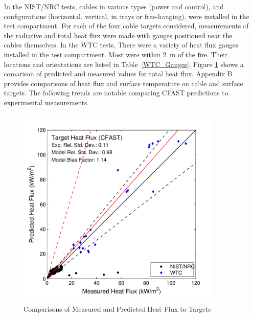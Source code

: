 In the NIST/NRC tests, cables in various types (power and control), and configurations (horizontal, vertical, in trays or free-hanging), were installed in the test compartment. For each of the four cable targets considered, measurements of the radiative and total heat flux were made with gauges positioned near the cables themselves.  In the WTC tests, There were a variety of heat flux gauges installed in the test compartment. Most were within 2~m of the fire. Their locations and orientations are listed in Table~\ref{WTC_Gauges}. Figure \ref{fig:Target_Flux_Scatter} shows a comarison of predicted and measured values for total heat flux. Appendix B provides comparisons of heat flux and surface temperature on cable and surface targets.  The following trends are notable comparing CFAST predictions to experimental measurements.

\begin{figure}
\begin{center}
\includegraphics[width=4in]{FIGURES/ScatterPlots/Target_Heat_Flux}
\end{center}
\caption{Comparisons of Measured and Predicted Heat Flux to Targets} \label{fig:Target_Flux_Scatter}
\end{figure}


